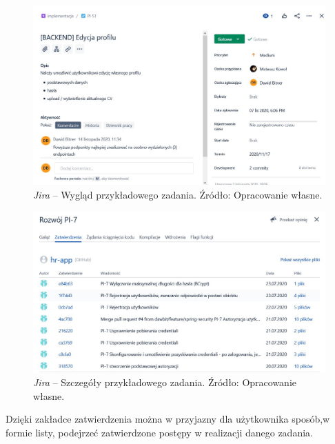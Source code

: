 \documentclass[twoside]{projektInzynierskiMS}
\numberwithin{figure}{section}
\begin{document}
\begin{figure}[h!]
  \centering
  \includegraphics[scale=0.55]{images/jira3.JPG}
    \caption{\textit{Jira} -- Wygląd przykładowego zadania. Źródło: Opracowanie własne.}
    \label{fig:jira_task}
\end{figure}

\newpage

\begin{figure}[h!]
  \centering
  \includegraphics[scale=0.60]{images/jira5.JPG}
    \caption{\textit{Jira} -- Szczegóły przykładowego zadania. Źródło: Opracowanie własne.}
    \label{fig:jira_task_details}
\end{figure}

Dzięki zakładce zatwierdzenia można w przyjazny dla użytkownika sposób,\linebreak w formie listy, podejrzeć zatwierdzone postępy w realizacji danego zadania.
\end{document}
